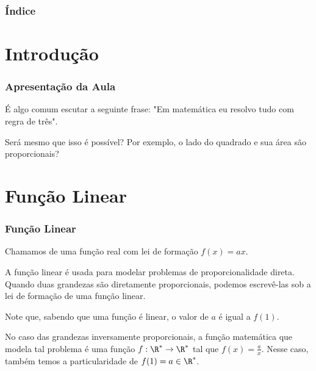 \documentclass[10pt]{beamer}
\begin{document}
	


	{\backgroundimage\begin{frame}[plain]
		\titlepage
	\end{frame}}



	\begin{frame}
		\frametitle{Índice}
		\tableofcontents
	\end{frame}



\section{Introdução}

\begin{frame}  \frametitle{Apresentação da Aula}

É algo  comum escutar a seguinte frase: "Em matemática eu resolvo
tudo com regra de três".

Será mesmo que isso é possível? Por exemplo, o lado do quadrado e
sua área são proporcionais?


\end{frame}


\section{Função Linear}
\begin{frame} \frametitle{Função Linear}
\begin{definicao}
Chamamos de  uma função real com lei de formação
$f(x) = ax$.
\end{definicao}\pause

A função linear é usada para modelar problemas de proporcionalidade
direta. Quando duas grandezas são diretamente proporcionais, podemos
escrevê-las sob a lei de formação de uma função linear.

Note que, sabendo que uma função é linear, o valor de $a$ é igual a
$f(1)$.\pause

No caso das grandezas inversamente proporcionais, a função
matemática que modela tal problema é uma função $f: \R^{\ast} \to
\R^{\ast}$ tal que $f(x) = \frac a x$. Nesse caso, também temos a
particularidade de $f(1) = a \in \R^{\ast}$.



\end{frame}
\end{document}
